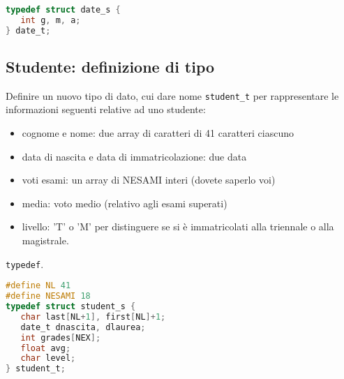 \begin{lstlisting}[language=c]
typedef struct date_s {
   int g, m, a;
} date_t;
\end{lstlisting}

\subsection{Studente: definizione di tipo}
Definire un nuovo tipo di dato, cui dare nome \texttt{student\_t} per rappresentare le informazioni seguenti relative ad uno studente:
\begin{itemize}
\item cognome e nome: due array di caratteri di 41 caratteri ciascuno
\item data di nascita e data di immatricolazione: due data
\item voti esami: un array di NESAMI interi (dovete saperlo voi)
\item media: voto medio (relativo agli esami superati)
\item livello: 'T' o 'M' per distinguere se si \`e immatricolati alla triennale o alla magistrale. 
\end{itemize}

\begin{tags}
\texttt{typedef}.
\end{tags}

\begin{lstlisting}[language=c]
#define NL 41
#define NESAMI 18
typedef struct student_s {
   char last[NL+1], first[NL]+1;
   date_t dnascita, dlaurea;
   int grades[NEX];
   float avg;
   char level;
} student_t;
\end{lstlisting}


